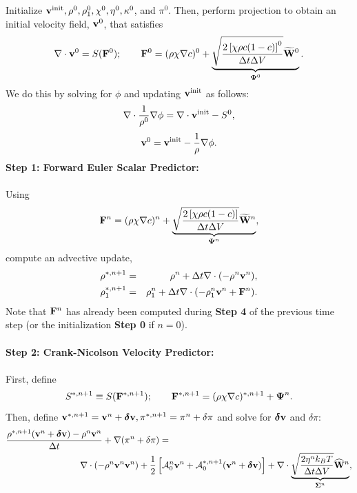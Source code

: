 \documentclass[final]{siamltex}
\def\Fb {{\bf F}}
\def\vb {{\bf v}}
\def\Wb {{\bf W}}
\def\deltab {\boldsymbol{\delta}}
\def\Psib   {\boldsymbol{\Psi}}
\def\Sigmab {\boldsymbol{\Sigma}}
\def\half   {\frac{1}{2}}
\begin{document}
Initialize $\vb^{\rm init}, \rho^0, \rho_1^0, \chi^0, \eta^0, \kappa^0$, and $\pi^0$.
Then, perform projection to obtain an initial velocity field, $\vb^0$, that satisfies
\begin{equation}
\nabla\cdot\vb^0 = S(\Fb^0); \qquad 
\Fb^0 = (\rho\chi\nabla c)^0 + \underbrace{\sqrt{\frac{2\left[\chi\rho c(1-c)\right]^0}{\Delta t\Delta V}}\widetilde\Wb^0}_{\Psib^0}.
\end{equation}
We do this by solving for $\phi$ and updating $\vb^{\rm init}$ as follows:
\begin{equation}
\nabla\cdot\frac{1}{\rho^0}\nabla\phi = \nabla\cdot\vb^{\rm init} - S^0,
\end{equation}
\begin{equation}
\vb^0 = \vb^{\rm init} - \frac{1}{\rho}\nabla\phi.
\end{equation}
{\bf Step 1: Forward Euler Scalar Predictor:}\\ \\
Using
\begin{equation}
\Fb^n = (\rho\chi\nabla c)^n + \underbrace{\sqrt{\frac{2\left[\chi\rho c(1-c)\right]}{\Delta t\Delta V}}\widetilde\Wb^n}_{\Psib^n},
\end{equation}
compute an advective update,
\begin{eqnarray}
\rho^{*,n+1} &=& \rho^n + \Delta t\nabla\cdot(-\rho^n\vb^n),\\
\rho_1^{*,n+1} &=& \rho_1^n + \Delta t\nabla\cdot(-\rho_1^n\vb^n + \Fb^n).
\end{eqnarray}
Note that $\Fb^n$ has already been computed during {\bf Step 4} of the previous time step
(or the initialization {\bf Step 0} if $n=0$).\\ \\
{\bf Step 2: Crank-Nicolson Velocity Predictor:}\\ \\
First, define
\begin{equation}
S^{*,n+1} \equiv S(\Fb^{*,n+1});
\qquad
\Fb^{*,n+1} = (\rho\chi\nabla c)^{*,n+1} + \Psib^n.
\end{equation}
Then, define $\vb^{*,n+1} = \vb^n + \deltab\vb, \pi^{*,n+1} = \pi^n + \delta\pi$ and solve
for $\deltab\vb$ and $\delta\pi$:
\begin{eqnarray}
\frac{\rho^{*,n+1}(\vb^n + \deltab\vb) - \rho^n\vb^n}{\Delta t} + \nabla(\pi^n+\delta\pi) &=&\nonumber\\
&&\hspace{-1.5in}\nabla\cdot(-\rho^n\vb^n\vb^n) + \half\left[\mathcal{A}_0^n\vb^n + \mathcal{A}_0^{*,n+1}(\vb^n + \deltab\vb)\right] + \nabla\cdot\underbrace{\sqrt{\frac{2\eta^n k_B T}{\Delta t\Delta V}}\widehat\Wb^n}_{\Sigmab^n},
\end{eqnarray}
\end{document}
